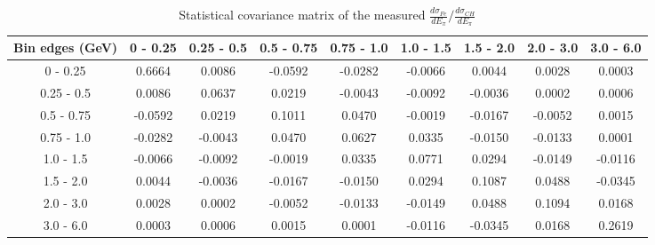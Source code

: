 \documentclass[aps,prl,twocolumn,superscriptaddress,nofootinbib]{revtex4-1}
\begin{document}
\begin{table}[h!]
  \centering
  \caption{Statistical covariance matrix of the measured $\frac{d\sigma_{Fe}}{dE_{\pi}}/\frac{d\sigma_{CH}}{dE_{\pi}}$}
    \begin{tabular}{c||cccccccc}
      Bin edges (GeV) & 0 - 0.25 & 0.25 - 0.5 & 0.5 - 0.75 & 0.75 - 1.0 & 1.0 - 1.5 & 1.5 - 2.0 & 2.0 - 3.0 & 3.0 - 6.0 \\
\hline \hline
        0 - 0.25 &  0.6664 &  0.0086 & -0.0592 & -0.0282 & -0.0066 &  0.0044 &  0.0028 &  0.0003 \\
      0.25 - 0.5 &  0.0086 &  0.0637 &  0.0219 & -0.0043 & -0.0092 & -0.0036 &  0.0002 &  0.0006 \\
      0.5 - 0.75 & -0.0592 &  0.0219 &  0.1011 &  0.0470 & -0.0019 & -0.0167 & -0.0052 &  0.0015 \\
      0.75 - 1.0 & -0.0282 & -0.0043 &  0.0470 &  0.0627 &  0.0335 & -0.0150 & -0.0133 &  0.0001 \\
       1.0 - 1.5 & -0.0066 & -0.0092 & -0.0019 &  0.0335 &  0.0771 &  0.0294 & -0.0149 & -0.0116 \\
       1.5 - 2.0 &  0.0044 & -0.0036 & -0.0167 & -0.0150 &  0.0294 &  0.1087 &  0.0488 & -0.0345 \\
       2.0 - 3.0 &  0.0028 &  0.0002 & -0.0052 & -0.0133 & -0.0149 &  0.0488 &  0.1094 &  0.0168 \\
       3.0 - 6.0 &  0.0003 &  0.0006 &  0.0015 &  0.0001 & -0.0116 & -0.0345 &  0.0168 &  0.2619 \\
    \end{tabular}
  \label{tablecov:Fe_Statistical_Epi}
\end{table}
\end{document}
